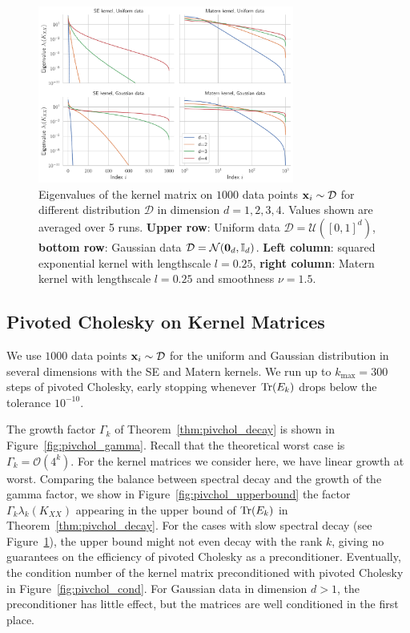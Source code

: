 \documentclass{article}
\begin{document}
\begin{figure}
    \centering
    \includegraphics[width=0.75\textwidth]{report/res/kernel_eigvals.pdf}
    \caption{Eigenvalues of the kernel matrix on $1000$ data points $\boldsymbol{\mathbf{x}}_i \sim \mathcal D$ for different distribution $\mathcal D$ in dimension $d=1,2,3,4$. Values shown are averaged over 5 runs. \textbf{Upper row}: Uniform data $\mathcal D = \mathcal U([0,1]^d)$, \textbf{bottom row}: Gaussian data  $\mathcal D = \mathcal N(\boldsymbol{\mathbf{0}}_d, \mathbb I_d)$. \textbf{Left column}: squared exponential kernel with lengthscale $l = 0.25$, \textbf{right column}: Matern kernel with lengthscale $l=0.25$ and smoothness $\nu = 1.5$. 
    }
    \label{fig:kernel_mx_eigvals}
\end{figure}

\subsection{Pivoted Cholesky on Kernel Matrices}

We use $1000$ data points $\boldsymbol{\mathbf{x}}_i \sim \mathcal D$ for the uniform and Gaussian distribution in several dimensions with the SE and Matern kernels. We run up to $k_{\max} = 300$ steps of pivoted Cholesky, early stopping whenever $\operatorname{Tr}(E_k)$ drops below the tolerance $10^{-10}$. 

The growth factor $\Gamma_k$ of Theorem~\ref{thm:pivchol_decay} is shown in Figure~\ref{fig:pivchol_gamma}. Recall that the theoretical worst case is $\Gamma_k = \mathcal O(4^k)$. For the kernel matrices we consider here, we have linear growth at worst. 
Comparing the balance between spectral decay and the growth of the gamma factor, we show in Figure~\ref{fig:pivchol_upperbound} the factor $\Gamma_k \lambda_k(K_{XX})$ appearing in the upper bound of $\operatorname{Tr}(E_k)$ in Theorem~\ref{thm:pivchol_decay}. For the cases with slow spectral decay (see Figure~\ref{fig:kernel_mx_eigvals}), the upper bound might not even decay with the rank $k$, giving no guarantees on the efficiency of pivoted Cholesky as a preconditioner. 
Eventually, the condition number of the kernel matrix preconditioned with pivoted Cholesky in Figure~\ref{fig:pivchol_cond}. For Gaussian data in dimension $d> 1$, the preconditioner has little effect, but the matrices are well conditioned in the first place.
\end{document}
